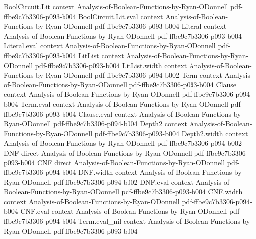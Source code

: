 \begin{lemma}
\leanok
{}
\proofstep
  {BoolCircuit.Lit}
  {context}
  {Analysis-of-Boolean-Functions-by-Ryan-ODonnell}
  {pdf-ffbe9c7b3306-p093-b004}
\proofstep
  {BoolCircuit.Lit.eval}
  {context}
  {Analysis-of-Boolean-Functions-by-Ryan-ODonnell}
  {pdf-ffbe9c7b3306-p093-b004}
\proofstep
  {Literal}
  {context}
  {Analysis-of-Boolean-Functions-by-Ryan-ODonnell}
  {pdf-ffbe9c7b3306-p093-b004}
\proofstep
  {Literal.eval}
  {context}
  {Analysis-of-Boolean-Functions-by-Ryan-ODonnell}
  {pdf-ffbe9c7b3306-p093-b004}
\proofstep
  {LitList}
  {context}
  {Analysis-of-Boolean-Functions-by-Ryan-ODonnell}
  {pdf-ffbe9c7b3306-p093-b004}
\proofstep
  {LitList.width}
  {context}
  {Analysis-of-Boolean-Functions-by-Ryan-ODonnell}
  {pdf-ffbe9c7b3306-p094-b002}
\proofstep
  {Term}
  {context}
  {Analysis-of-Boolean-Functions-by-Ryan-ODonnell}
  {pdf-ffbe9c7b3306-p093-b004}
\proofstep
  {Clause}
  {context}
  {Analysis-of-Boolean-Functions-by-Ryan-ODonnell}
  {pdf-ffbe9c7b3306-p094-b004}
\proofstep
  {Term.eval}
  {context}
  {Analysis-of-Boolean-Functions-by-Ryan-ODonnell}
  {pdf-ffbe9c7b3306-p093-b004}
\proofstep
  {Clause.eval}
  {context}
  {Analysis-of-Boolean-Functions-by-Ryan-ODonnell}
  {pdf-ffbe9c7b3306-p094-b004}
\proofstep
  {Depth2}
  {context}
  {Analysis-of-Boolean-Functions-by-Ryan-ODonnell}
  {pdf-ffbe9c7b3306-p093-b004}
\proofstep
  {Depth2.width}
  {context}
  {Analysis-of-Boolean-Functions-by-Ryan-ODonnell}
  {pdf-ffbe9c7b3306-p094-b002}
\proofstep
  {DNF}
  {direct}
  {Analysis-of-Boolean-Functions-by-Ryan-ODonnell}
  {pdf-ffbe9c7b3306-p093-b004}
\proofstep
  {CNF}
  {direct}
  {Analysis-of-Boolean-Functions-by-Ryan-ODonnell}
  {pdf-ffbe9c7b3306-p094-b004}
\proofstep
  {DNF.width}
  {context}
  {Analysis-of-Boolean-Functions-by-Ryan-ODonnell}
  {pdf-ffbe9c7b3306-p094-b002}
\proofstep
  {DNF.eval}
  {context}
  {Analysis-of-Boolean-Functions-by-Ryan-ODonnell}
  {pdf-ffbe9c7b3306-p093-b004}
\proofstep
  {CNF.width}
  {context}
  {Analysis-of-Boolean-Functions-by-Ryan-ODonnell}
  {pdf-ffbe9c7b3306-p094-b004}
\proofstep
  {CNF.eval}
  {context}
  {Analysis-of-Boolean-Functions-by-Ryan-ODonnell}
  {pdf-ffbe9c7b3306-p094-b004}
\proofstep
  {Term.eval_nil}
  {context}
  {Analysis-of-Boolean-Functions-by-Ryan-ODonnell}
  {pdf-ffbe9c7b3306-p093-b004}

\end{lemma}
